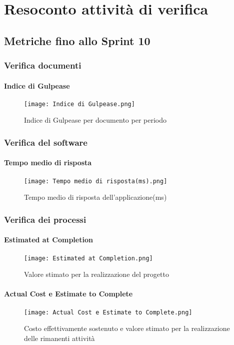 \chapter{Resoconto attività di verifica}

\section{Metriche fino allo Sprint 10}

  \subsection{Verifica documenti}
    \subsubsection{Indice di Gulpease}
    \begin{figure}[H]
      \centering
      \texttt{[image: Indice di Gulpease.png]}
      \caption{Indice di Gulpease per documento per periodo}
    \end{figure}

  \subsection{Verifica del software}
    \subsubsection{Tempo medio di risposta}
    \begin{figure}[H]
      \centering
      \texttt{[image: Tempo medio di risposta(ms).png]}
      \caption{Tempo medio di risposta dell'applicazione(ms)}
    \end{figure}


  \subsection{Verifica dei processi}
    \subsubsection{Estimated at Completion}
    \begin{figure}[H]
      \centering
      \texttt{[image: Estimated at Completion.png]}
      \caption{Valore stimato per la realizzazione del progetto}
    \end{figure}

    \subsubsection{Actual Cost e Estimate to Complete}
    \begin{figure}[H]
      \centering
      \texttt{[image: Actual Cost e Estimate to Complete.png]}
      \caption{Costo effettivamente sostenuto e valore stimato per la realizzazione delle rimanenti attività}
    \end{figure}

